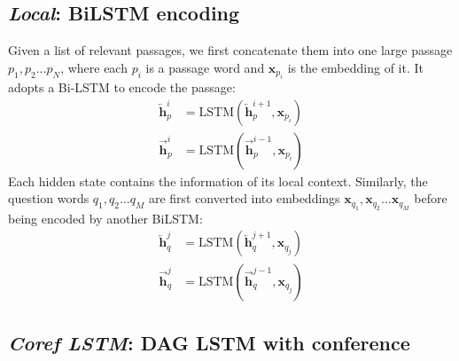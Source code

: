 \documentclass[letterpaper]{article}
\begin{document}
\subsection{\emph{Local}: BiLSTM encoding}

Given a list of relevant passages, we first concatenate them into one large passage $p_1, p_2 \dots p_N$, where each $p_i$ is a passage word and $\boldsymbol{x}_{p_i}$ is the embedding of it.
It adopts a Bi-LSTM to encode the passage:
\begin{align*}
\overleftarrow{\boldsymbol{h}}_p^i &= \textrm{LSTM}(\overleftarrow{\boldsymbol{h}}_p^{i+1}, \boldsymbol{x}_{p_i}) \\
\overrightarrow{\boldsymbol{h}}_p^i &= \textrm{LSTM}(\overrightarrow{\boldsymbol{h}}_p^{i-1}, \boldsymbol{x}_{p_i})
\end{align*}
Each hidden state contains the information of its local context.
Similarly, the question words $q_1, q_2 \dots q_M$ are first converted into embeddings $\boldsymbol{x}_{q_1}, \boldsymbol{x}_{q_2} \dots \boldsymbol{x}_{q_M}$ before being encoded by another BiLSTM:
\begin{align*}
\overleftarrow{\boldsymbol{h}}_q^j &= \textrm{LSTM}(\overleftarrow{\boldsymbol{h}}_q^{j+1}, \boldsymbol{x}_{q_j}) \\
\overrightarrow{\boldsymbol{h}}_q^j &= \textrm{LSTM}(\overrightarrow{\boldsymbol{h}}_q^{j-1}, \boldsymbol{x}_{q_j})
\end{align*}

\subsection{\emph{Coref LSTM}: DAG LSTM with conference}
\end{document}
